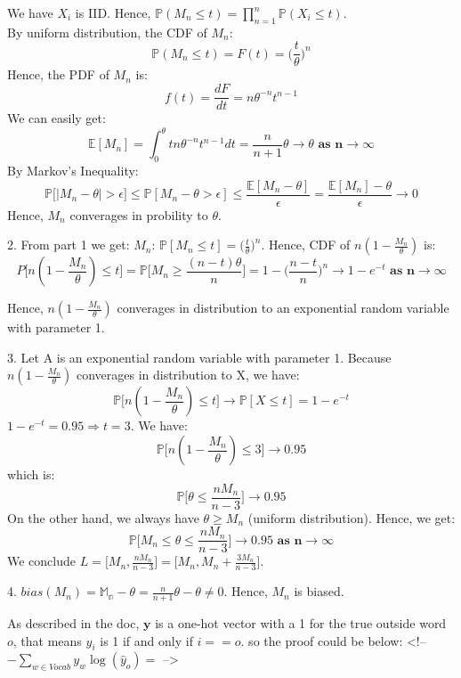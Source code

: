 \documentclass[10pt]{article}
\newenvironment{problem}[2][Problem]{\begin{trivlist}
\item[\hskip \labelsep {\bfseries #1}\hskip \labelsep {\bfseries #2.}]}{\end{trivlist}}
\begin{document}
\begin{problem}{4}
We have $X_i$ is IID. Hence, $\mathbb{P}(M_n \leqslant t)=\prod_{n=1}^{n}\mathbb{P}(X_i\leqslant t).$\\
By uniform distribution, the CDF of $M_n$:
\[ \mathbb{P}(M_n \leqslant t)=F(t)=\Big(\frac{t}{\theta}\Big)^n \]
Hence, the PDF of $M_n$ is:
\[f(t)=\frac{dF}{dt}=n\theta^{-n}t^{n-1} \]
We can easily get:
\[\mathbb{E}[M_n]= \int_{0}^{\theta} tn\theta^{-n}t^{n-1}dt=\frac{n}{n+1}\theta \rightarrow \theta \textbf{ as n}\rightarrow \infty \]
By Markov's Inequality:
\[ \mathbb{P}\Big[ | M_n -\theta|> \epsilon \Big]\leqslant \mathbb{P}[M_n-\theta>\epsilon] \leqslant \frac{\mathbb{E}[M_n-\theta]}{\epsilon}=\frac{\mathbb{E}[M_n]-\theta}{\epsilon} \rightarrow 0\]
Hence, $M_n$ converages in probility to $\theta$.

\item 2.
From part 1 we get: $M_n$: $\mathbb{P}[M_n \leqslant t]=\Big(\frac{t}{\theta}\Big)^n$. Hence, CDF of $n(1-\frac{M_n}{\theta})$ is:
\[ P\Big[n(1-\frac{M_n}{\theta})\leqslant t\Big]=\mathbb{P}\Big[M_n \geqslant \frac{(n-t)\theta}{n} \Big] =1-\Big(\frac{n-t}{n}\Big)^{n} \rightarrow 1- e^{-t} \textbf{ as n}  \rightarrow \infty\]

Hence, $n(1-\frac{M_n}{\theta})$ converages in distribution to an exponential random variable with parameter 1.
\item 3.
Let A is an exponential random variable with parameter 1. Because $n(1-\frac{M_n}{\theta})$ converages in distribution to X, we have:
\[\mathbb{P}\Big[ n(1-\frac{M_n}{\theta}) \leqslant t\Big] \rightarrow \mathbb{P}[X\leqslant t]= 1-e^{-t} \]
$1-e^{-t}=0.95 \Rightarrow t=3$. We have:
\[ \mathbb{P}\Big[ n(1-\frac{M_n}{\theta}) \leqslant 3\Big] \rightarrow 0.95\]
which is:
\[ \mathbb{P}\Big[ \theta \leqslant \frac{nM_n}{n-3}\Big] \rightarrow 0.95\]
On the other hand, we always have $\theta \geqslant M_n$ (uniform distribution). Hence, we get: 
\[ \mathbb{P}\Big[M_n \leqslant \theta \leqslant \frac{nM_n}{n-3}\Big] \rightarrow 0.95 \textbf{ as n} \rightarrow \infty\]
We conclude $L=\Big[M_n, \frac{nM_n}{n-3} \Big]=\Big[ M_n, M_n+ \frac{3M_n}{n-3} \Big]$.
\item 4.
$bias(M_n)=\mathbb{M_n}-\theta= \frac{n}{n+1}\theta -\theta \neq 0$. Hence, $M_n$ is biased.

As described in the doc, $\boldsymbol{y}$ is a one-hot vector with a 1 for the true outside word $o$, that means $y_i$ is 1 if and only if $i == o$. so the proof could be below:
<!-- $ - \sum_{w\in Vocab}y_w\log(\hat{y}_o) = $ -->


\end{problem}
\end{document}
